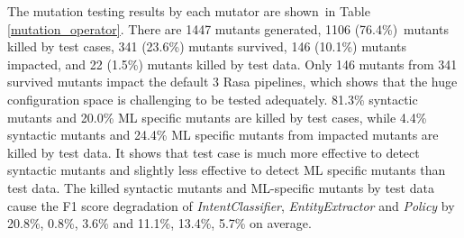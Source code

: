 
  The mutation testing results by each mutator are shown~in Table \ref{mutation_operator}. There are 1447 mutants generated, 1106 (76.4\%)~mutants killed by test cases, 341 (23.6\%) mutants survived, 146 (10.1\%) mutants impacted, and 22 (1.5\%) mutants killed by test data. 
  Only 146 mutants from 341 survived mutants impact the default 3 Rasa pipelines, which shows that the huge configuration space is challenging to be tested  adequately.
  81.3\% syntactic mutants and 20.0\% ML specific mutants are killed by test cases, while 4.4\% syntactic mutants and 24.4\% ML specific mutants from impacted mutants are killed by test data.
  It shows that test case is much more effective to detect syntactic mutants and slightly less effective to detect ML specific mutants than test data. 
  The killed syntactic mutants and ML-specific mutants by test data cause the F1 score degradation of \textit{IntentClassifier}, \textit{EntityExtractor} and \textit{Policy} by 20.8\%, 0.8\%, 3.6\% and 11.1\%, 13.4\%, 5.7\% on average.

  
  


